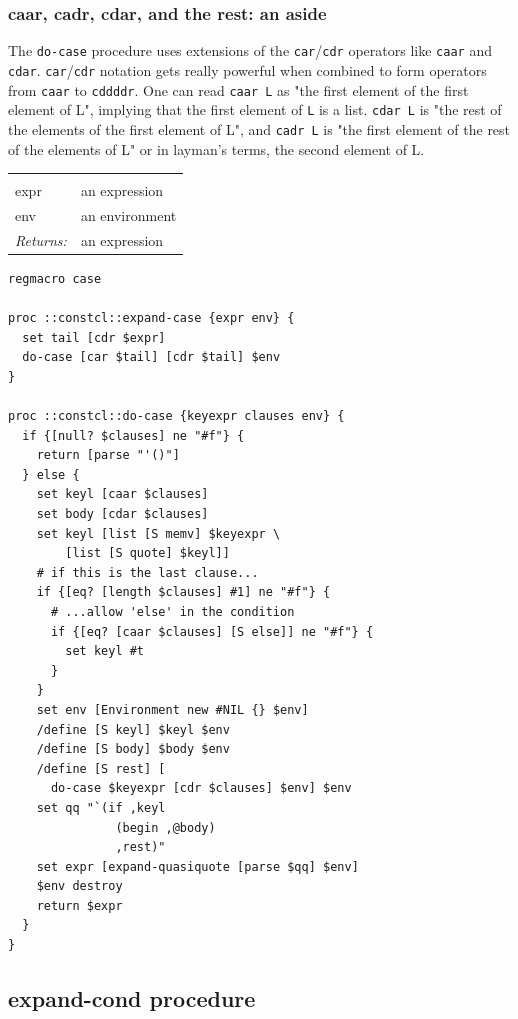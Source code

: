 \documentclass[twoside,9pt]{report}
\begin{document}
\subsubsection{caar, cadr, cdar, and the rest: an aside}
\label{caar,-cadr,-cdar,-and-the-rest-an-aside}


The \texttt{do-case} procedure uses extensions of the \texttt{car}/\texttt{cdr} operators like \texttt{caar} and \texttt{cdar}. \texttt{car}/\texttt{cdr} notation gets really powerful when combined to form operators from \texttt{caar} to \texttt{cddddr}. One can read \texttt{caar L} as "the first element of the first element of L", implying that the first element of \texttt{L} is a list. \texttt{cdar L} is "the rest of the elements of the first element of L", and \texttt{cadr L} is "the first element of the rest of the elements of L" or in layman's terms, the second element of L.

\noindent\begin{tabular}{ |p{1.5cm} p{8cm}| }
\hline
\rowcolor[HTML]{CCCCCC} \multicolumn{2}{|l|}{\bf expand-case (internal)} \\
expr & an expression \\
env & an environment \\
\textit{Returns:} & an expression \\
\hline
\end{tabular}
\begin{lstlisting}
regmacro case
 
proc ::constcl::expand-case {expr env} {
  set tail [cdr $expr]
  do-case [car $tail] [cdr $tail] $env
}
 
proc ::constcl::do-case {keyexpr clauses env} {
  if {[null? $clauses] ne "#f"} {
    return [parse "'()"]
  } else {
    set keyl [caar $clauses]
    set body [cdar $clauses]
    set keyl [list [S memv] $keyexpr \
        [list [S quote] $keyl]]
    # if this is the last clause...
    if {[eq? [length $clauses] #1] ne "#f"} {
      # ...allow 'else' in the condition
      if {[eq? [caar $clauses] [S else]] ne "#f"} {
        set keyl #t
      }
    }
    set env [Environment new #NIL {} $env]
    /define [S keyl] $keyl $env
    /define [S body] $body $env
    /define [S rest] [
      do-case $keyexpr [cdr $clauses] $env] $env
    set qq "`(if ,keyl
               (begin ,@body)
               ,rest)"
    set expr [expand-quasiquote [parse $qq] $env]
    $env destroy
    return $expr
  }
}
\end{lstlisting}
\subsection{expand-cond procedure}
\label{expand-cond-procedure}
\end{document}
